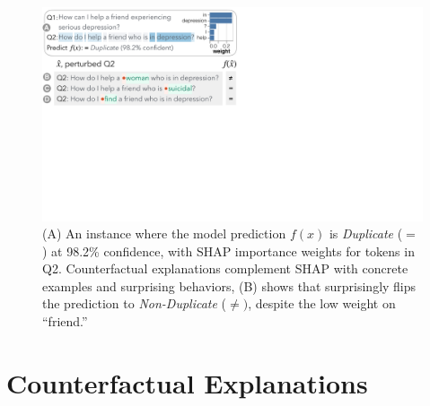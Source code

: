 
\newcommand{\fwone}[1]{\colbox{cfwone}{#1}\xspace}
\newcommand{\fwtwo}[1]{\colbox{cfwtwo}{#1}\xspace}
\newcommand{\fwthree}[1]{\colbox{cfwthree}{#1}\xspace}
\newcommand{\fwfour}[1]{\colbox{cfwfour}{#1}\xspace}

\newcommand{\fexp}[2]{\texttt{[{\color{darkgray}{#1:#2}}]}\xspace}
\newcommand{\fexptag}[1]{\fexp{TAG}{#1}}
\newcommand{\fexpfrom}[1]{\fexp{FROM}{#1}}
\newcommand{\fexpto}[1]{\fexp{TO}{#1}}
\newcommand{\fexptemp}[1]{\fexp{TEMP}{#1}}


\begin{figure}[t]
\centering
\includegraphics[trim={0 21cm 33cm 0cm},clip,width=1\columnwidth]{figures/explanation_v2.pdf}
\vspace{-15pt}
\caption{
(A) An instance where the \qqp model prediction
$f(x)$ is \emph{Duplicate} ($=$) at 98.2\% confidence, with SHAP importance weights for tokens in Q2.
Counterfactual explanations complement SHAP with concrete examples and surprising behaviors, \eg (B) shows that  surprisingly flips the prediction to \emph{Non-Duplicate} ($\neq)$, despite the low weight on ``friend.''
}
\vspace{-5pt}
\label{fig:explanation}
\end{figure}
\section{Counterfactual Explanations}
\label{sec:app_explain}

